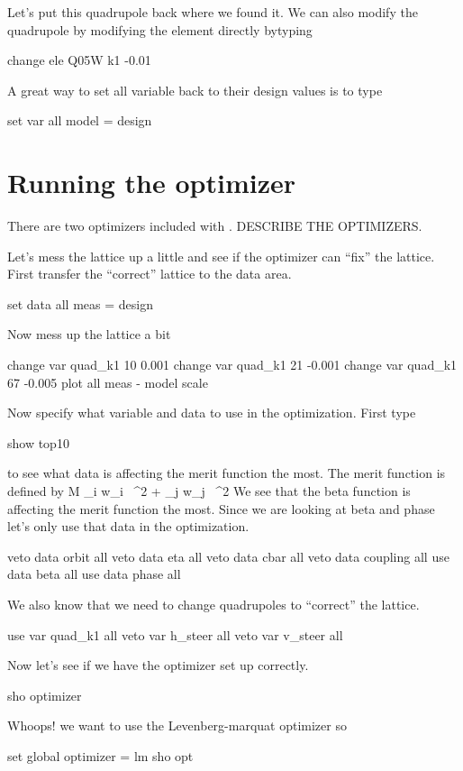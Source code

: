 \documentclass{report}
\begin{document}
Let's put this quadrupole back where we found it. We can also modify the quadrupole
by modifying the element directly bytyping
\begin{example}
  change ele Q05W k1 -0.01
\end{example}

A great way to set all variable back to their design values is to type
\begin{example}
  set var all model = design
\end{example}

\chapter{Running the optimizer}
\label{c:optimizer}

There are two optimizers included with \tao. DESCRIBE THE OPTIMIZERS.

Let's mess the lattice up a little and see if the optimizer can ``fix'' the
lattice. First transfer the ``correct'' lattice to the  data area.
\begin{example}
  set data all meas = design
\end{example}
Now mess up the lattice a bit
\begin{example}
  change var quad\_k1 10 0.001
  change var quad\_k1 21 -0.001
  change var quad\_k1 67 -0.005
  plot all meas - model
  scale
\end{example}

Now specify what variable and data to use in the optimization. First type
\begin{example}
  show top10
\end{example}
to see what data is affecting the merit function the most. The merit function is
defined by
\Begineq
  {\cal M} \equiv \sum\_{i} w\_i \,
    ^2 + 
  \sum\_{j} w\_j \,
    ^2
  \label{m1}
\Endeq
We see that the beta function is affecting the merit function the most. Since we
are looking at beta and phase let's only use that data in the optimization.
\begin{example}
  veto data orbit all
  veto data eta all
  veto data cbar all
  veto data coupling all
  use  data beta all
  use  data phase all
\end{example}
We also know that we need to change quadrupoles to ``correct'' the lattice.
\begin{example}
  use var quad\_k1 all
  veto var h\_steer all
  veto var v\_steer all
\end{example}
Now let's see if we have the optimizer set up correctly.
\begin{example}
  sho optimizer
\end{example}
Whoops! we want to use the Levenberg-marquat optimizer so
\begin{example}
  set global optimizer = lm
  sho opt
\end{example}
\end{document}
